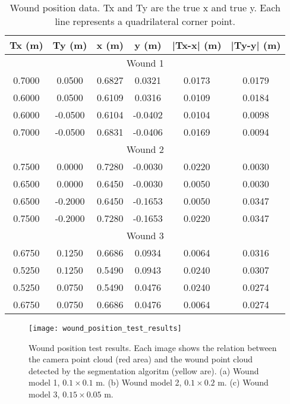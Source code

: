 \begin{table}[htbp]
    \centering
    \caption[Wound position data.]{Wound position data. Tx and Ty are the true x and true y. Each line represents a quadrilateral corner point.}
    \begin{tabular}{c|c|c|c|c|c}
        \toprule
         \textbf{Tx (m)} & \textbf{Ty (m)} & \textbf{x (m)} & \textbf{y (m)} & \textbf{|Tx-x| (m)} & \textbf{|Ty-y| (m)} \\
         \midrule
         \multicolumn{6}{c}{Wound 1} \\
         \midrule
         0.7000 & 0.0500 & 0.6827 & 0.0321 & 0.0173 & 0.0179 \\
         0.6000	& 0.0500 & 0.6109 &	0.0316 & 0.0109	& 0.0184 \\
         0.6000	& -0.0500 &	0.6104 & -0.0402 & 0.0104 &	0.0098 \\
         0.7000	& -0.0500 &	0.6831 & -0.0406 & 0.0169 &	0.0094 \\
         \midrule
         \multicolumn{6}{c}{Wound 2} \\
         \midrule
         0.7500	& 0.0000 & 0.7280 &	-0.0030 & 0.0220 & 0.0030 \\
         0.6500	& 0.0000 & 0.6450 &	-0.0030 & 0.0050 & 0.0030 \\
         0.6500	& -0.2000 &	0.6450 & -0.1653 & 0.0050 & 0.0347 \\
         0.7500	& -0.2000 &	0.7280 & -0.1653 & 0.0220 & 0.0347 \\
         \midrule
         \multicolumn{6}{c}{Wound 3} \\
         \midrule
         0.6750	& 0.1250 & 0.6686 &	0.0934 & 0.0064 & 0.0316 \\
         0.5250	& 0.1250 & 0.5490 & 0.0943 & 0.0240 & 0.0307 \\
         0.5250	& 0.0750 & 0.5490 & 0.0476 & 0.0240	& 0.0274 \\
         0.6750	& 0.0750 & 0.6686 & 0.0476 & 0.0064	& 0.0274 \\
         \bottomrule
    \end{tabular}
    \label{tab:wound_position_results}
\end{table}

\begin{figure}[htbp]
	\centering
	\texttt{[image: wound\_position\_test\_results]}
	\caption[Wound position test results.]{Wound position test results. Each image shows the relation between the camera point cloud (red area) and the wound point cloud detected by the segmentation algoritm (yellow are). (a) Wound model 1, $0.1\times0.1$ \si{\meter}. (b) Wound model 2, $0.1\times0.2$ \si{\meter}. (c) Wound model 3, $0.15\times0.05$ \si{\meter}.}
	\label{fig:simulation_test_results_camera_spatial_data_wound_position_test_results}
\end{figure}

